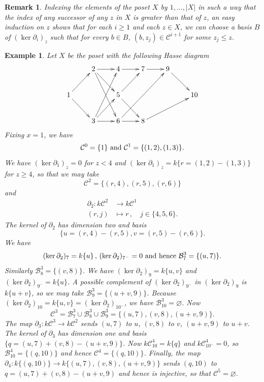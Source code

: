 \documentclass[preprint,review,12pt]{elsarticle}
\newcommand{\C}{{\mathcal C}}
\newcommand{\B}{{\mathcal B}}
\newtheorem{obs}[deft]{Remark}
\newtheorem{ex}[deft]{Example}
\begin{document}
\begin{obs}\label{obs useful basis of ker partial}
Indexing the elements of the poset $X$ by $1, \hdots, |X|$ in such a way that the index of any successor of any $z$ in $X$ is greater than that of $z$, an easy induction on $z$ shows that for each $i\geqslant 1$ and each $z\in X$, we can choose a basis $B$ of $(\ker\partial_{i})_{z}$ such that for every $b\in B$, $(b,z_j)\in \C^{i+1}$ for some $z_j\leqslant z$.
\end{obs}

\begin{ex}
Let $X$ be the poset with the following Hasse diagram
	$$\xymatrix{ & 2\ar[r]\ar[rd]\ar[rdd] & 4\ar[r] & 7\ar[r] & 9\ar[rd] & \\ 1\ar[rd]\ar[ru]& & 5\ar[rd]\ar[ru] & & & 10 \\
	& 3\ar[ruu]\ar[ru]\ar[r] & 6\ar[r]\ar[rruu] & 8\ar[rru] & }$$
Fixing $x=1$, we have
	$$\C^{0} = \{1\}\hbox{ and } \C^1 =  \{(1,2),(1,3)\}.$$
We have $(\ker \partial_1)_z = 0$ for $z<4$ and $(\ker \partial_1)_z = k\{ r = (1,2)-(1,3)\}$ for $z\geqslant 4$, so that we may take
	$$\C^2 = \{(r,4), (r,5), (r,6)\}$$  
and 
\begin{align*}
\partial_2 : k\C^2 & \to k\C^{1} \\
(r,j) &\mapsto r\,,\quad j\in \{4,5,6\}.
\end{align*}
The kernel of $\partial_2$ has dimension two and basis 
	$$\{u = (r,4)-(r,5), v = (r,5)-(r,6)\}.$$
We have 
	$$(\ker \partial_2)_{7}=k\{ u\}\,,\, (\ker \partial_2)_{7^-} = 0\hbox{ and hence }\B_7^3 = \{(u,7)\}.$$
Similarly $\B_8^3 = \{(v,8)\}$. 
We have $(\ker \partial_2)_9=k\{u,v\} $ and $(\ker \partial_2)_{9^-}=k\{ u\}$. A possible complement of $(\ker \partial_2)_{9^-}$ in $(\ker \partial_2)_{9}$ is $k\{ u+v\}$, so we may take $\B^3_9=\{(u+v,9)\}$. Because $(\ker \partial_2)_{10}=k\{u,v\}=(\ker \partial_2)_{10^-}$, we have $\B^3_{10}=\varnothing$. Now 
	$$\C^3= \B^3_7 \cup \B^3_8\cup \B^3_9 = \{(u,7),(v,8), (u+v,9)\}.$$     
The map $\partial_3 : k\C^3  \to k\C^{2}$ sends $(u,7)$ to $u$, $(v,8)$ to $v$, $(u+v,9)$ to $u+v$.  The kernel of $\partial_3$ has dimension one and basis $\{q = (u,7)+(v,8)- (u+v,9)\}$.  Now $k\C^4_{10}=k\{ q\}$ and $k\C^4_{10^{-}} = 0$, so $\B^4_{10}=\{(q,10)\}$ and hence $\C^4=\{(q,10)\}$.  Finally, the map $\partial_4 : k\{ (q,10)\} \to k\{ (u,7), (v,8), (u+v, 9) \}$ sends $(q,10)$ to $q = (u,7)+(v,8)- (u+v,9)$ and hence is injective, so that $\C^5 = \varnothing$.  
\end{ex}
\end{document}
